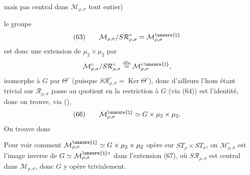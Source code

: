 \par{}


mais pas central dans $\mathcal M_{\rho,\sigma}$ tout entier)

le groupe
\[
(63)\qquad
\mathcal M_{\rho,\sigma}/S\mathcal R_{\rho,\sigma}^{\circ}
=\mathcal M_{\rho,\sigma}^{\unsure{\natural}}
\]
est donc une extension de $\mu_2\times\mu_2$ par
\[
\mathcal M_{\rho,\sigma}^{\circ}/S\mathcal R_{\rho,\sigma}^{\circ}
\overset{\mathrm{dfn}}{=}
\mathcal M_{\rho,\sigma}^{\circ\unsure{\natural}},
\]
isomorphe à $G$ par $\Theta^\circ$
(puisque $S\mathcal R_{\rho,\sigma}^{\circ}=\operatorname{Ker}\Theta^\circ$), donc
d'ailleurs l'hom
étant trivial sur $\mathcal R_{\rho,\sigma}$ passe au quotient en
 la restriction à $G$ (via (64)) est l'identité,
donc on trouve, via (),
\[
(66)\qquad
\mathcal M_{\rho,\sigma}^{\unsure{\natural}}\simeq
G\times\mu_2\times\mu_2.
\]
On trouve donc

Pour voir comment
$\mathcal M_{\rho,\sigma}^{\unsure{\natural}}\simeq G\times\mu_2\times\mu_2$
opère sur $ST_\rho\times ST_\sigma$, on
$\mathcal M_{\rho,\sigma}^{\circ}$ est l'image inverse de
$G\simeq\mathcal M_{\rho,\sigma}^{\unsure{\natural}\circ}$
dans l'extension (67), où $S\mathcal R_{\rho,\sigma}$ est central
dans $\mathcal M_{\rho,\sigma}$, donc $G$ y opère trivialement.

